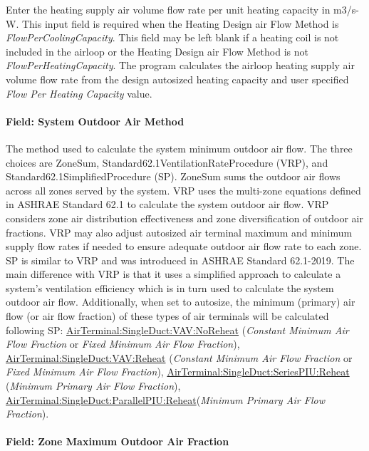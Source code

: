 Enter the heating supply air volume flow rate per unit heating capacity in m3/s-W. This input field is required when the Heating Design air Flow Method is \emph{FlowPerCoolingCapacity}. This field may be left blank if a heating coil is not included in the airloop or the Heating Design air Flow Method is not \emph{FlowPerHeatingCapacity}. The program calculates the airloop heating supply air volume flow rate from the design autosized heating capacity and user specified \emph{Flow Per Heating Capacity} value.

\paragraph{Field: System Outdoor Air Method}\label{field-system-outdoor-air-method-000}

The method used to calculate the system minimum outdoor air flow. The three choices are ZoneSum, Standard62.1VentilationRateProcedure (VRP), and Standard62.1SimplifiedProcedure (SP). ZoneSum sums the outdoor air flows across all zones served by the system. VRP uses the multi-zone equations defined in ASHRAE Standard 62.1 to calculate the system outdoor air flow. VRP considers zone air distribution effectiveness and zone diversification of outdoor air fractions. VRP may also adjust autosized air terminal maximum and minimum supply flow rates if needed to ensure adequate outdoor air flow rate to each zone. SP is similar to VRP and was introduced in ASHRAE Standard 62.1-2019. The main difference with VRP is that it uses a simplified approach to calculate a system's ventilation efficiency which is in turn used to calculate the system outdoor air flow. Additionally, when set to autosize, the minimum (primary) air flow (or air flow fraction) of these types of air terminals will be calculated following SP: \hyperref[airterminalsingleductvavnoreheat]{AirTerminal:SingleDuct:VAV:NoReheat} (\emph{Constant Minimum Air Flow Fraction} or \emph{Fixed Minimum Air Flow Fraction}),
\hyperref[airterminalsingleductvavreheat]{AirTerminal:SingleDuct:VAV:Reheat} (\emph{Constant Minimum Air Flow Fraction} or \emph{Fixed Minimum Air Flow Fraction}), \hyperref[airterminalsingleductseriespiureheat]{AirTerminal:SingleDuct:SeriesPIU:Reheat} (\emph{Minimum Primary Air Flow Fraction}),
 \hyperref[airterminalsingleductparallelpiureheat]{AirTerminal:SingleDuct:ParallelPIU:Reheat}(\emph{Minimum Primary Air Flow Fraction}).

\paragraph{Field: Zone Maximum Outdoor Air Fraction}\label{field-zone-maximum-outdoor-air-fraction-000}

